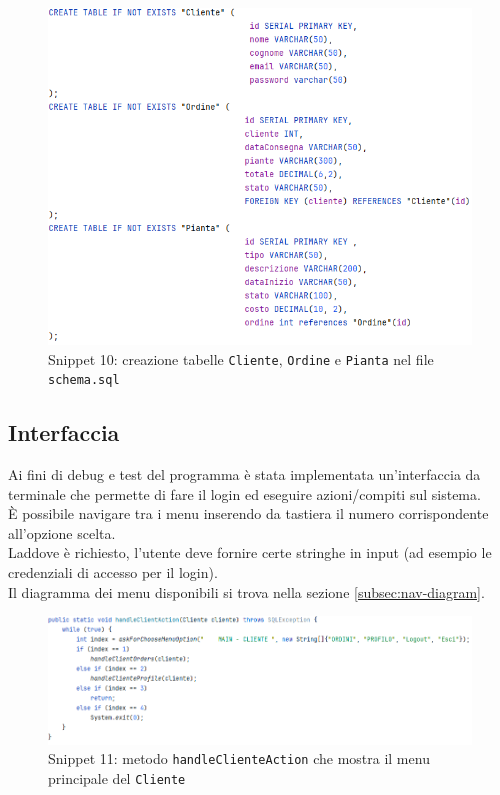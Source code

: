 \documentclass{article}
\newcommand{\code}[1]{\texttt{#1}}
\begin{document}
\begin{figure}[H]
    \centering
    \includegraphics[scale=0.5]{resources/images/Snippets/snippet_createtable.png}
    \captionsetup{labelformat=empty,labelsep=none}
    \caption{Snippet 10: creazione tabelle \code{Cliente}, \code{Ordine} e \code{Pianta} nel file \code{schema.sql}}
    \label{fig:snippet_createtable}
\end{figure}


\subsection{Interfaccia}
Ai fini di debug e test del programma è stata implementata un'interfaccia da terminale che permette di fare il login ed eseguire azioni/compiti sul sistema.\\
È possibile navigare tra i menu inserendo da tastiera il numero corrispondente all'opzione scelta.\\
Laddove è richiesto, l'utente deve fornire certe stringhe in input (ad esempio le credenziali di accesso per il login).\\
Il diagramma dei menu disponibili si trova nella sezione \ref{subsec:nav-diagram}.

\begin{figure}[H]
    \centering
    \includegraphics[scale=0.5]{resources/images/Snippets/snippet_handleclienteaction.png}
    \captionsetup{labelformat=empty,labelsep=none}
    \caption{Snippet 11: metodo \code{handleClienteAction} che mostra il menu principale del \code{Cliente}}
    \label{fig:snippet_handleclienteaction}
\end{figure}
\end{document}
